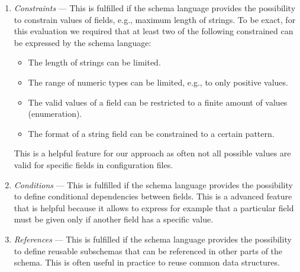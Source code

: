 \begin{enumerate}
\begin{enumerate}
        \item \textit{Constraints} --- This is fulfilled if the schema language provides the possibility to constrain values of fields, e.g., maximum length of strings.
        To be exact, for this evaluation we required that at least two of the following constrained can be expressed by the schema language:
        \begin{itemize}
            \item The length of strings can be limited.
            \item The range of numeric types can be limited, e.g., to only positive values.
            \item The valid values of a field can be restricted to a finite amount of values (enumeration).
            \item The format of a string field can be constrained to a certain pattern.
        \end{itemize}
        This is a helpful feature for our approach as often not all possible values are valid for specific fields in configuration files.
        \item \textit{Conditions} --- This is fulfilled if the schema language provides the possibility to define conditional dependencies between fields.
        This is a advanced feature that is helpful because it allows to express for example that a particular field must be given only if another field has a specific value.
        \item \textit{References} --- This is fulfilled if the schema language provides the possibility to define reusable subschemas that can be referenced in other parts of the schema.
        This is often useful in practice to reuse common data structures.

    \end{enumerate}



\end{enumerate}


